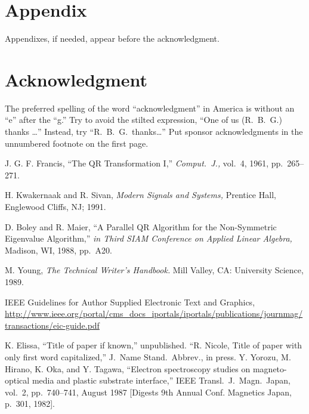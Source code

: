 \documentclass[conference]{IEEEtran}
\theoremstyle{definition}
\begin{document}
\section*{Appendix}
Appendixes, if needed, appear before the acknowledgment.

\section*{Acknowledgment}
The preferred spelling of the word ``acknowledgment'' in America is without an ``e'' after the ``g.''  Try to avoid the stilted expression, ``One of us (R.~B.~G.) thanks \dots'' Instead, try ``R.~B.~G.\ thanks\dots''  Put sponsor acknowledgments in the unnumbered footnote on the first page.


\begin{thebibliography}{99}

J. G. F. Francis, ``The QR Transformation I,'' {\it Comput.\ J.,} vol.~4, 1961, pp.~265--271.

H. Kwakernaak and R. Sivan, {\it Modern Signals and Systems,} Prentice Hall, Englewood Cliffs, NJ; 1991.

D. Boley and R. Maier, ``A Parallel QR Algorithm for the Non-Symmetric Eigenvalue Algorithm,'' {\it in Third SIAM Conference on Applied Linear Algebra,} Madison, WI, 1988, pp.~A20.


M. Young, {\it The Technical Writer's Handbook.} Mill Valley, CA:  University Science, 1989.

IEEE Guidelines for Author
Supplied Electronic
Text and Graphics, \url{http://www.ieee.org/portal/cms_docs_iportals/iportals/publications/journmag/transactions/eic-guide.pdf}

 K. Elissa, ``Title of paper if known,'' unpublished.
 ``R. Nicole, Title of paper with only first word capitalized,'' J.\ Name Stand.\ Abbrev., in press.
 Y. Yorozu, M. Hirano, K. Oka, and Y. Tagawa, ``Electron spectroscopy studies on magneto-optical media and plastic substrate interface,'' IEEE Transl.\ J.\ Magn.\ Japan, vol.~2, pp.~740--741, August 1987 [Digests 9th Annual Conf. Magnetics Japan, p.~301, 1982].

\end{thebibliography}
\end{document}
